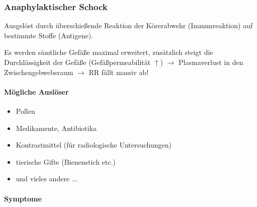 \subsubsection{Anaphylaktischer Schock}

 Ausgelöst durch überschießende Reaktion der Körerabwehr (Immunreaktion) auf
bestimmte Stoffe (Antigene). 


Es werden sämtliche Gefäße maximal erweitert, zusätzlich
steigt die Durchlässigkeit der Gefäße
(Gefäßpermeabilität ${\uparrow}$) ${\rightarrow}$ 
Plasmaverlust in den Zwischengebwebsraum 
${\rightarrow}$ RR fällt massiv ab!

\paragraph{Mögliche Auslöser} 

\begin{itemize}
\item Pollen
\item Medikamente, Antibiotika
\item Kontrastmittel (für radiologische Untersuchungen)
\item tierische Gifte (Bienenstich etc.)
\item und vieles andere ...
\end{itemize}

\paragraph{Symptome}


